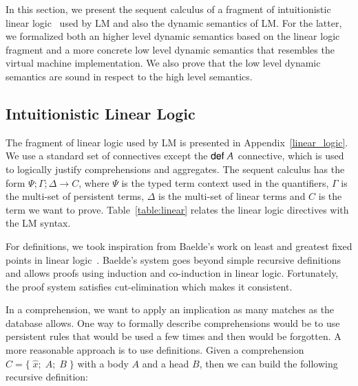 
\newcommand{\mz}{\m{match} \;}
\newcommand{\tab}[0]{\;\;\;\;}
\newcommand{\dz}{\m{derive} \;}
\newcommand{\comp}[0]{\m{comp} \;}
\newcommand{\az}{\m{apply} \;}
\newcommand{\doz}{\m{run} \;}
\newcommand{\seqnocut}[3]{#1 ; #2 \Rightarrow #3}
\newcommand{\defeq}{\buildrel\triangle\over =}
\newcommand{\compr}[1]{\m{def} \; #1}

\newcommand{\mo}{\m{match}_1 \;}
\newcommand{\cont}{\m{cont} \;}
\newcommand{\contc}{\m{contc} \;}
\newcommand{\done}{\m{derive}_1 \;}
\newcommand{\doo}{\m{run}_1 \;}
\newcommand{\mc}[0]{\m{match}_c \; }
\newcommand{\dall}[0]{\m{fix} \; }
\newcommand{\strans}[0]{\m{strans} \;}
\newcommand{\dc}{\m{derive}_c \;}
\newcommand{\ao}{\m{apply}_1 \;}

In this section, we present the sequent calculus of a fragment of intuitionistic linear logic~\cite{Girard95logic:its} used by LM and also the dynamic semantics of LM. For the latter, we formalized both an higher level dynamic semantics based on the linear logic fragment and a more concrete low level dynamic semantics that resembles the virtual machine implementation. We also prove that the low level dynamic semantics are sound in respect to the high level semantics. 

\subsection{Intuitionistic Linear Logic}

The fragment of linear logic used by LM is presented in Appendix~\ref{linear_logic}.
We use a standard set of connectives except the $\mathsf{def} \; A$ connective, which is used to logically justify comprehensions and aggregates.
The sequent calculus has the form $\Psi; \Gamma; \Delta \rightarrow C$, where $\Psi$ is the typed term context used in the quantifiers, $\Gamma$ is the multi-set
of persistent terms, $\Delta$ is the multi-set of linear terms and $C$ is the term we want to prove.
Table~\ref{table:linear} relates the linear logic directives with the LM syntax.

For definitions, we took inspiration from Baelde's work on least and greatest fixed points in linear logic~\cite{Baelde:2012:LGF:2071368.2071370}. Baelde's system goes beyond
simple recursive definitions and allows proofs using induction and co-induction in linear logic. Fortunately, the proof system satisfies cut-elimination which
makes it consistent.

In a comprehension, we want to apply an implication as many matches as the database allows. One way to formally describe comprehensions would be to use persistent
rules that would be used a few times and then would be forgotten. A more reasonable approach is to use
definitions. Given a comprehension $C = \{ \; \widehat{x}; \; A; \; B \; \}$ with a body $A$ and a head $B$, then we can build the following recursive definition:

